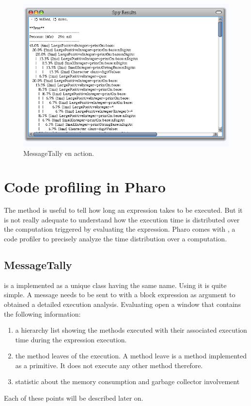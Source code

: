 \documentclass[a4paper,10pt,twoside]{book}
\begin{document}
\begin{figure}
	\begin{center}
	\includegraphics[width=.8\linewidth]{MessageTallyOne}
	\caption{MessageTally en action.}
	\end{center}
\end{figure}


\section{Code profiling in Pharo} 

The  method is useful to tell how long an expression takes to be executed. But it is not really adequate to understand how the execution time is distributed over the computation triggered by evaluating the expression. Pharo comes with , a code profiler to precisely analyze the time distribution over a computation. 


\subsection{MessageTally}
 is a implemented as a unique class having the same name. Using it is quite simple. A message  needs to be sent to  with a block expression as argument to obtained a detailed execution analysis. Evaluating  open a window that contains the following information:

\begin{enumerate}
\item a hierarchy list showing the methods executed with their associated execution time during the expression execution.

\item the method leaves of the execution. A method leave is a method implemented as a primitive. It does not execute any other method therefore.

\item statistic about the memory consumption and garbage collector involvement 

\end{enumerate}
Each of these points will be described later on.
\end{document}
